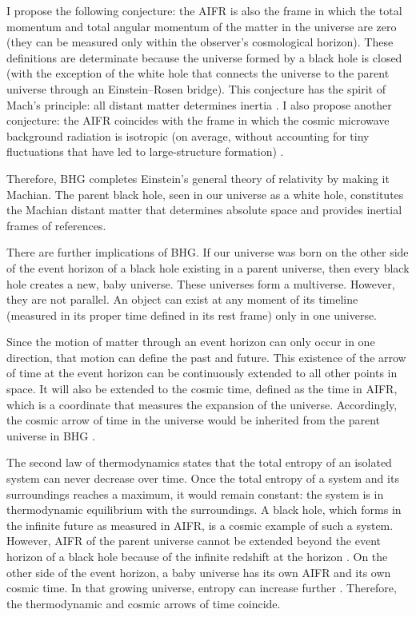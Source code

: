 \documentclass[prl,twocolumn,nofootinbib]{revtex4}
\begin{document}
I propose the following conjecture: the AIFR is also the frame in which the total momentum and total angular momentum of the matter in the universe are zero (they can be measured only within the observer's cosmological horizon).
These definitions are determinate because the universe formed by a black hole is closed (with the exception of the white hole that connects the universe to the parent universe through an Einstein--Rosen bridge).
This conjecture has the spirit of Mach's principle: all distant matter determines inertia \cite{Mach}.
I also propose another conjecture: the AIFR coincides with the frame in which the cosmic microwave background radiation is isotropic (on average, without accounting for tiny fluctuations that have led to large-structure formation) \cite{pref}.

Therefore, BHG completes Einstein's general theory of relativity by making it Machian.
The parent black hole, seen in our universe as a white hole, constitutes the Machian distant matter that determines absolute space and provides inertial frames of references.

There are further implications of BHG.
If our universe was born on the other side of the event horizon of a black hole existing in a parent universe, then every black hole creates a new, baby universe.
These universes form a multiverse.
However, they are not parallel.
An object can exist at any moment of its timeline (measured in its proper time defined in its rest frame) only in one universe.

Since the motion of matter through an event horizon can only occur in one direction, that motion can define the past and future.
This existence of the arrow of time at the event horizon can be continuously extended to all other points in space.
It will also be extended to the cosmic time, defined as the time in AIFR, which is a coordinate that measures the expansion of the universe.
Accordingly, the cosmic arrow of time in the universe would be inherited from the parent universe in BHG \cite{essay}.

The second law of thermodynamics states that the total entropy of an isolated system can never decrease over time.
Once the total entropy of a system and its surroundings reaches a maximum, it would remain constant: the system is in thermodynamic equilibrium with the surroundings.
A black hole, which forms in the infinite future as measured in AIFR, is a cosmic example of such a system.
However, AIFR of the parent universe cannot be extended beyond the event horizon of a black hole because of the infinite redshift at the horizon \cite{LL2}.
On the other side of the event horizon, a baby universe has its own AIFR and its own cosmic time.
In that growing universe, entropy can increase further \cite{ApJ}.
Therefore, the thermodynamic and cosmic arrows of time coincide.
\end{document}
